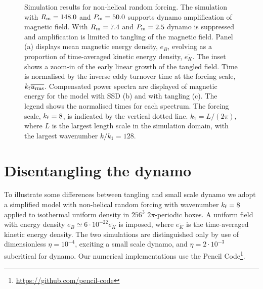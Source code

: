 \documentclass[preprint2]{aastex63}
\newcommand\kf{k_{\rm f} }
\begin{document}

\begin{figure*}
\caption{
Simulation results for non-helical random forcing. 
The simulation with $R_{\rm m}=148.0$ and $P_{\rm m}=50.0$ supports dynamo 
amplification of magnetic field.
With $R_{\rm m}=7.4$ and $P_{\rm m}=2.5$ dynamo is suppressed and 
amplification is limited to tangling of the magnetic field.
Panel (a) displays mean magnetic energy density, $e_B$, evolving as a
proportion of time-averaged kinetic energy density, $\overline{e_K}$.
The inset shows a zoom-in of the early linear growth of the tangled field.
Time is normalised by the inverse eddy turnover time at the forcing scale,
$\kf \overline{u_{\rm rms}}$.
Compensated power spectra are displayed of magnetic energy for the model with
SSD (b) and with tangling (c).
The legend shows the normalised times for each spectrum.
The forcing scale, $\kf=8$, is indicated by the vertical dotted line.
$k_1=L/(2\pi)$, where $L$ is the largest length scale in the simulation domain,
with the largest wavenumber $k/k_1=128$.
\label{fig:tangling}}
\end{figure*}


\section{Disentangling the dynamo} \label{sec:ssd-tang}

To illustrate some differences between tangling and small scale dynamo we adopt
a simplified model with non-helical random forcing with wavenumber $\kf=8$
applied to isothermal uniform density in $256^3$ $2\pi$-periodic boxes.
A uniform field with energy density $e_B\simeq6\cdot10^{-22}\overline{e_K}$ is
imposed, where $\overline{e_K}$ is the time-averaged kinetic energy density.
The two simulations are distinguished only by use of dimensionless
$\eta=10^{-4}$, exciting a small scale dynamo, and $\eta=2\cdot10^{-3}$
subcritical for dynamo.
Our numerical implementations use the {\sc Pencil Code}\footnote{
\href{https://github.com/pencil-code}{https://github.com/pencil-code}}.
\end{document}

